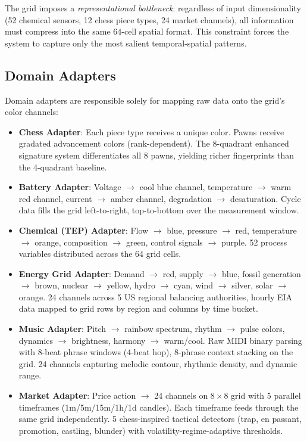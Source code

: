 \documentclass[11pt,a4paper]{article}
\begin{document}
The grid imposes a \emph{representational bottleneck}: regardless of input
dimensionality (52 chemical sensors, 12 chess piece types, 24 market channels), all
information must compress into the same $64$-cell spatial format. This constraint forces
the system to capture only the most salient temporal-spatial patterns.

\subsection{Domain Adapters}
Domain adapters are responsible solely for mapping raw data onto the grid's color channels:

\begin{itemize}
    \item \textbf{Chess Adapter}: Each piece type receives a unique color. Pawns receive
    gradated advancement colors (rank-dependent). The 8-quadrant enhanced signature system
    differentiates all 8 pawns, yielding richer fingerprints than the 4-quadrant baseline.
    \item \textbf{Battery Adapter}: Voltage $\to$ cool blue channel, temperature $\to$ warm
    red channel, current $\to$ amber channel, degradation $\to$ desaturation. Cycle data
    fills the grid left-to-right, top-to-bottom over the measurement window.
    \item \textbf{Chemical (TEP) Adapter}: Flow $\to$ blue, pressure $\to$ red,
    temperature $\to$ orange, composition $\to$ green, control signals $\to$ purple. 52
    process variables distributed across the 64 grid cells.
    \item \textbf{Energy Grid Adapter}: Demand $\to$ red, supply $\to$ blue,
    fossil generation $\to$ brown, nuclear $\to$ yellow, hydro $\to$ cyan, wind $\to$ silver,
    solar $\to$ orange. 24 channels across 5 US regional balancing authorities,
    hourly EIA data mapped to grid rows by region and columns by time bucket.
    \item \textbf{Music Adapter}: Pitch $\to$ rainbow spectrum, rhythm $\to$ pulse
    colors, dynamics $\to$ brightness, harmony $\to$ warm/cool. Raw MIDI binary parsing
    with 8-beat phrase windows (4-beat hop), 8-phrase context stacking on the grid.
    24 channels capturing melodic contour, rhythmic density, and dynamic range.
    \item \textbf{Market Adapter}: Price action $\to$ 24 channels on $8\times8$ grid with
    5 parallel timeframes (1m/5m/15m/1h/1d candles). Each timeframe feeds through
    the same grid independently. 5 chess-inspired tactical detectors (trap, en passant,
    promotion, castling, blunder) with volatility-regime-adaptive thresholds.
\end{itemize}
\end{document}
